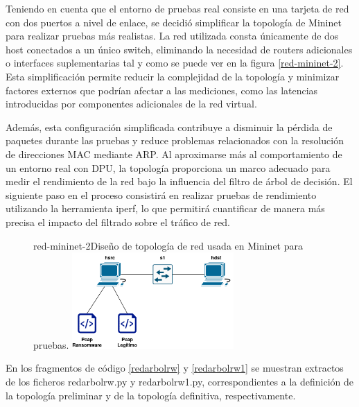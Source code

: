 Teniendo en cuenta que el entorno de pruebas real consiste en una tarjeta de red con dos puertos a nivel de enlace, se decidió simplificar la topología de Mininet para realizar pruebas más realistas. La red utilizada consta únicamente de dos host conectados a un único switch, eliminando la necesidad de routers adicionales o interfaces suplementarias tal y como se puede ver en la figura \ref{red-mininet-2}. Esta simplificación permite reducir la complejidad de la topología y minimizar factores externos que podrían afectar a las mediciones, como las latencias introducidas por componentes adicionales de la red virtual.

Además, esta configuración simplificada contribuye a disminuir la pérdida de paquetes durante las pruebas y reduce problemas relacionados con la resolución de direcciones MAC mediante ARP. Al aproximarse más al comportamiento de un entorno real con DPU, la topología proporciona un marco adecuado para medir el rendimiento de la red bajo la influencia del filtro de árbol de decisión. El siguiente paso en el proceso consistirá en realizar pruebas de rendimiento utilizando la herramienta iperf, lo que permitirá cuantificar de manera más precisa el impacto del filtrado sobre el tráfico de red.

\begin{figure}[Topología de Red Final]{red-mininet-2}{Diseño de topología de red usada en Mininet para pruebas.}
	\includegraphics[width=0.55\textwidth]{capturas/DiagramaRed2.png}
\end{figure}

En los fragmentos de código \ref{redarbolrw} y \ref{redarbolrw1} se muestran extractos de los ficheros redarbolrw.py y redarbolrw1.py, correspondientes a la definición de la topología preliminar y de la topología definitiva, respectivamente.


